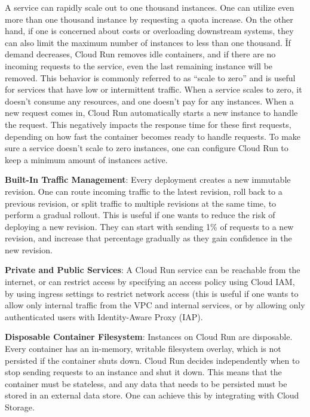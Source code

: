 A service can rapidly scale out to one thousand instances. One can utilize even more than one thousand instance by
requesting a quota increase. On the other hand, if one is concerned about costs or overloading downstream systems,
they can also limit the maximum number of instances to less than one thousand. \v

If demand decreases, Cloud Run removes idle containers, and if there are no incoming requests to the service, even
the last remaining instance will be removed. This behavior is commonly referred to as ``scale to zero'' and is
useful for services that have low or intermittent traffic. When a service scales to zero, it doesn't consume any
resources, and one doesn't pay for any instances. When a new request comes in, Cloud Run automatically starts a new
instance to handle the request. This negatively impacts the response time for these first requests, depending on how
fast the container becomes ready to handle requests. To make sure a service doesn't scale to zero instances, one can
configure Cloud Run to keep a minimum amount of instances active.

\item \textbf{Built-In Traffic Management}: Every deployment creates a new immutable revision. One can route
incoming traffic to the latest revision, roll back to a previous revision, or split traffic to multiple revisions at
the same time, to perform a gradual rollout. This is useful if one wants to reduce the risk of deploying a new
revision. They can start with sending 1\% of requests to a new revision, and increase that percentage gradually as
they gain confidence in the new revision.

\item \textbf{Private and Public Services}: A Cloud Run service can be reachable from the internet, or can restrict
access by specifying an access policy using Cloud IAM, by using ingress settings to restrict network access (this is
useful if one wants to allow only internal traffic from the VPC and internal services, or by allowing only
authenticated users with Identity-Aware Proxy (IAP).

\item \textbf{Disposable Container Filesystem}: Instances on Cloud Run are disposable. Every container has an
in-memory, writable filesystem overlay, which is not persisted if the container shuts down. Cloud Run decides
independently when to stop sending requests to an instance and shut it down. This means that the container must be
stateless, and any data that needs to be persisted must be stored in an external data store. One can achieve this by
integrating with Cloud Storage.
\eit

